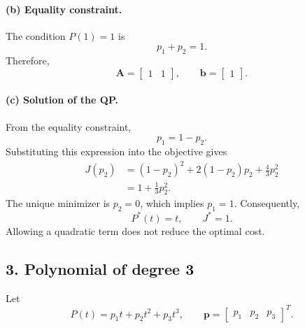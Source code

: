 \documentclass[11pt]{article}
\begin{document}
\paragraph{(b) Equality constraint.}
The condition $P(1)=1$ is
\begin{equation}
    p_1+p_2=1.
\end{equation}
Therefore,
\begin{equation}
    \boxed{
    \mathbf{A}=\begin{bmatrix}1 & 1\end{bmatrix},
    \qquad
    \mathbf{b}=\begin{bmatrix}1\end{bmatrix}.}
\end{equation}

\paragraph{(c) Solution of the QP.}
From the equality constraint,
\begin{equation}
    p_1=1-p_2.
\end{equation}
Substituting this expression into the objective gives
\begin{align}
    J(p_2)
    &=(1-p_2)^2+2(1-p_2)p_2+\frac{4}{3}p_2^2 \\
    &=1+\frac{1}{3}p_2^2.
\end{align}
The unique minimizer is $p_2=0$, which implies $p_1=1$.
Consequently,
\begin{equation}
    \boxed{P^*(t)=t, \qquad J^*=1.}
\end{equation}
Allowing a quadratic term does not reduce the optimal cost.

\subsection*{3. Polynomial of degree 3}

Let
\begin{equation}
    P(t)=p_1t+p_2t^2+p_3t^3,
    \qquad
    \mathbf{p}=\begin{bmatrix}p_1 & p_2 & p_3\end{bmatrix}^{T}.
\end{equation}
\end{document}
